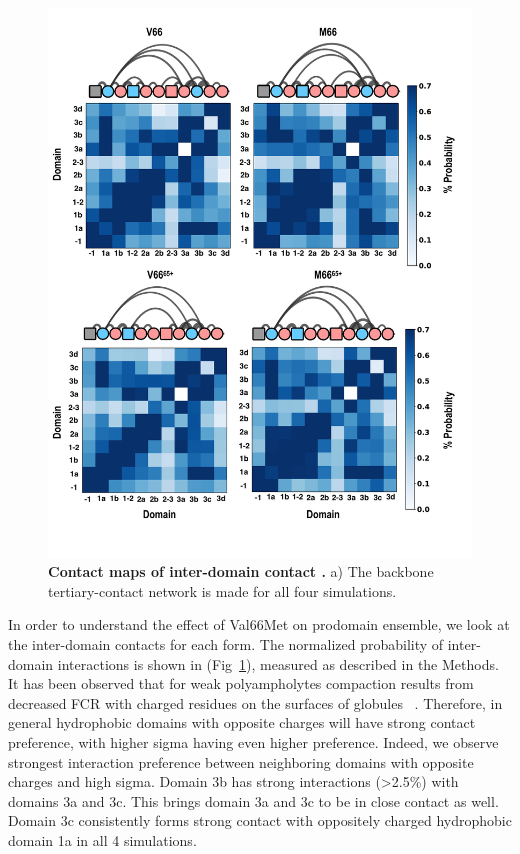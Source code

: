 \documentclass[journal=jacsat,manuscript=article]{achemso}
\begin{document}
\begin{figure}[!ht]
\includegraphics[scale=0.5,width=12cm,trim={0 0cm 0 0cm},clip]{../figures/fig4m.pdf}
\caption{{\bf Contact maps of inter-domain contact .} a) The backbone tertiary-contact network is made for all four simulations.  
 }
\label{fig4m}
\end{figure}

In order to understand the effect of Val66Met on prodomain ensemble, we look at the inter-domain contacts for each form. The normalized probability of inter-domain interactions is shown in (Fig~\ref{fig4m}), measured as described in the Methods. It has been observed that for weak polyampholytes compaction results from decreased FCR with charged residues on the surfaces of globules ~\cite{Das2013a}. Therefore, in general hydrophobic domains with opposite charges will have strong contact preference, with higher sigma having even higher preference. 
Indeed, we observe strongest interaction preference between neighboring domains with opposite charges and high sigma. Domain 3b has strong interactions (\textgreater 2.5\%) with domains 3a and 3c. This brings domain 3a and 3c to be in close contact as well. Domain 3c consistently forms strong contact with oppositely charged hydrophobic domain 1a in all 4 simulations.
\end{document}
